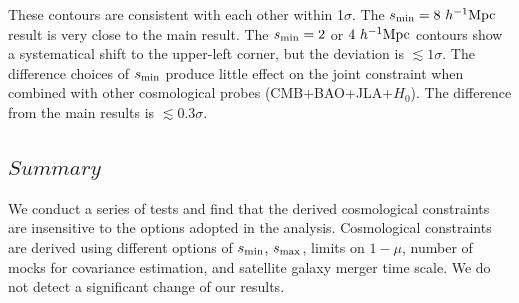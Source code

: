 \documentclass[iop]{emulateapj}
\begin{document}
These contours are consistent with each other within 1$\sigma$.
The $s_{\rm min}=8\ h^{-1}{\rm Mpc}$ result is very close to the main result.
The $s_{\rm min}=2$ or $4\ h^{-1}{\rm Mpc}$ contours show a systematical shift to the upper-left corner,
but the deviation is $\lesssim1\sigma$.
The difference choices of $s_{\rm min}$ produce little effect on 
the joint constraint when combined with other cosmological probes (CMB+BAO+JLA+$H_0$). 
The difference from the main results is $\lesssim0.3\sigma$.


\subsection{$Summary$}


We conduct a series of tests and find that the derived cosmological constraints are insensitive to the options adopted in the analysis.
Cosmological constraints are derived using different options of $s_{\rm min}$, $s_{\rm max}$, limits on $1-\mu$, number of mocks for covariance estimation,
and satellite galaxy merger time scale.
We do not detect a significant change of our results.

\end{document}
